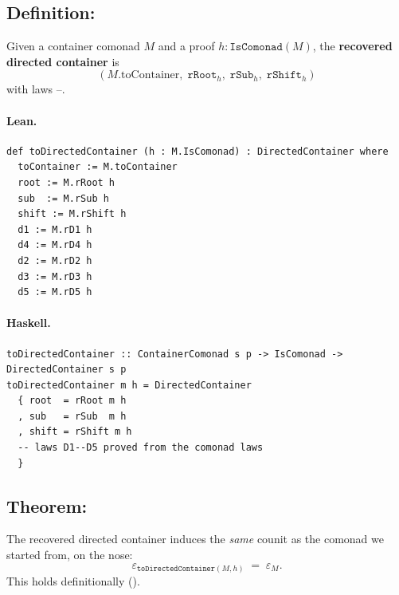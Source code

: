 \documentclass[11pt,a4paper]{article}
\begin{document}
\subsection{Definition: }

\begin{defn}
Given a container comonad $M$ and a proof $h : \mathtt{IsComonad}(M)$, the
\textbf{recovered directed container} is
\[
  (M.\mathrm{toContainer},\;
   \mathtt{rRoot}_h,\;
   \mathtt{rSub}_h,\;
   \mathtt{rShift}_h)
\]
with laws --.
\end{defn}

\paragraph{Lean.}
\begin{lstlisting}[style=lean]
def toDirectedContainer (h : M.IsComonad) : DirectedContainer where
  toContainer := M.toContainer
  root := M.rRoot h
  sub  := M.rSub h
  shift := M.rShift h
  d1 := M.rD1 h
  d4 := M.rD4 h
  d2 := M.rD2 h
  d3 := M.rD3 h
  d5 := M.rD5 h
\end{lstlisting}

\paragraph{Haskell.}
\begin{lstlisting}[style=haskell]
toDirectedContainer :: ContainerComonad s p -> IsComonad -> DirectedContainer s p
toDirectedContainer m h = DirectedContainer
  { root  = rRoot m h
  , sub   = rSub  m h
  , shift = rShift m h
  -- laws D1--D5 proved from the comonad laws
  }
\end{lstlisting}


\subsection{Theorem: }

\begin{thm}
The recovered directed container induces the \emph{same} counit as the
comonad we started from, on the nose:
\[
  \varepsilon_{\mathtt{toDirectedContainer}(M,h)}
  \;=\;
  \varepsilon_M.
\]
This holds definitionally ().
\end{thm}
\end{document}
